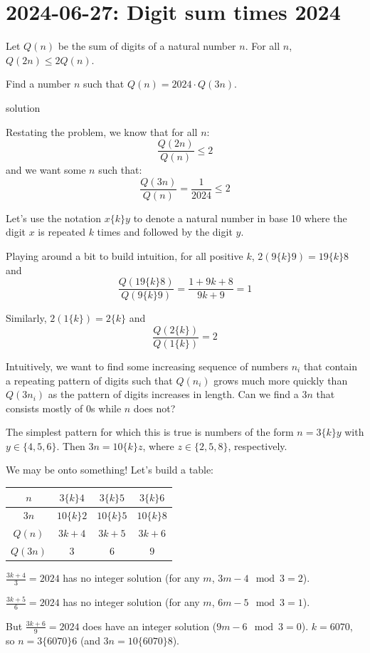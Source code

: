 \documentclass[11pt, oneside]{amsart}
\newcommand{\problem}[2]{\section*{#1: #2}}
\newcommand{\solution}[0]{{\sc solution}}
\begin{document}
\newpage
\problem{2024-06-27}{Digit sum times 2024}

Let $Q(n)$ be the sum of digits of a natural number $n$. For all $n$, $Q(2n) \leq 2Q(n)$.

Find a number $n$ such that $Q(n) = 2024 \cdot Q(3n)$.

\solution

Restating the problem, we know that for all $n$:
\[ \frac{Q(2n)}{Q(n)} \leq 2 \]
and we want some $n$ such that:
\[ \frac{Q(3n)}{Q(n)} = \frac{1}{2024} \leq 2 \]

Let's use the notation $x\{k\}y$ to denote a natural number in base 10 where the digit $x$ is repeated $k$ times
and followed by the digit $y$.

Playing around a bit to build intuition, for all positive $k$, $2(9\{k\}9) = 19\{k\}8$ and
\[ \frac{Q(19\{k\}8)}{Q(9\{k\}9)} = \frac{1+9k+8}{9k+9} = 1\]

Similarly, $2(1\{k\}) = 2\{k\}$ and
\[ \frac{Q(2\{k\})}{Q(1\{k\})} = 2\]

Intuitively, we want to find some increasing sequence of numbers $n_i$ that contain a repeating pattern of digits
such that $Q(n_i)$ grows much more quickly than $Q(3n_i)$ as the pattern of digits increases in length.
Can we find a $3n$ that consists mostly of 0s while $n$ does not?

The simplest pattern for which this is true is numbers of the form $n = 3\{k\}y$ with $y \in \{ 4, 5, 6 \}$. Then
$3n = 10\{k\}z$, where $z \in \{ 2, 5, 8 \}$, respectively.

We may be onto something! Let's build a table:

\begin{table}[h!]
\centering
\begin{tabular}{|c|c|c|c|}
	\hline
	$n$      & $3\{k\}4$    & $3\{k\}5$    & $3\{k\}6$ \\
	\hline
	$3n$     & $10\{k\}2$   & $10\{k\}5$   & $10\{k\}8$ \\
	\hline
	$Q(n)$   & $3k+4$       & $3k+5$       & $3k+6$ \\
	\hline
	$Q(3n)$  & $3$          & $6$          & $9$ \\
	\hline
\end{tabular}
\end{table}

$\frac{3k+4}{3} = 2024$ has no integer solution (for any $m$, $3m-4 \mod 3 = 2$).

$\frac{3k+5}{6} = 2024$ has no integer solution (for any $m$, $6m-5 \mod 3 = 1$).

But $\frac{3k+6}{9} = 2024$ does have an integer solution ($9m-6 \mod 3 = 0$). $k = 6070$,
so $n = 3\{6070\}6$ (and $3n = 10\{6070\}8$).
\end{document}
